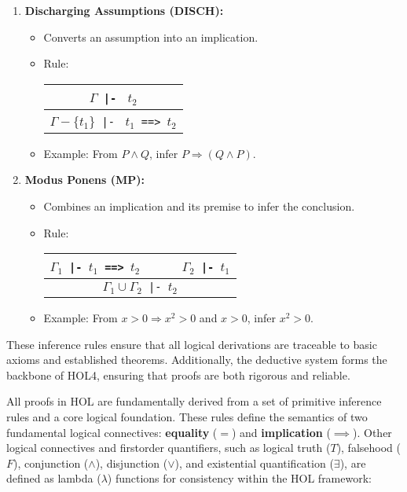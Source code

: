 \begin{enumerate}
    \item \textbf{Discharging Assumptions (DISCH):}
    \begin{itemize}
        \item Converts an assumption into an implication.
        \item Rule:
          \begin{center}
            \begin{tabular}{c}
              $\Gamma${\small\verb+ |- +} $t_2$ \\ \hline
              $\Gamma{-}\{t_1\}${\small\verb+ |- +} $t_1${\small\verb+ ==> +}$t_2$
            \end{tabular}
          \end{center}
        \item Example: From \(P \wedge Q\), infer \(P \Rightarrow (Q \wedge P)\).
    \end{itemize}

    \item \textbf{Modus Ponens (MP):}
    \begin{itemize}
        \item Combines an implication and its premise to infer the conclusion.
        \item Rule:
          \begin{center}
            \begin{tabular}{c}
              $\Gamma_1${\small\verb+ |- +}$t_1${\small\verb+ ==> +}$t_2$ {\small\verb+     +} $\Gamma_2${\small\verb+ |- +}$t_1$ \\
              \hline
              $\Gamma_1 \cup \Gamma_2${\small\verb+ |- +}$t_2$ \\
            \end{tabular}
          \end{center}
        \item Example: From \(x > 0 \Rightarrow x^2 > 0\) and \(x > 0\), infer \(x^2 > 0\).
    \end{itemize}
\end{enumerate}
These inference rules ensure that all logical derivations are traceable to basic axioms and established theorems. Additionally, the deductive system forms the backbone of HOL4, ensuring that proofs are both rigorous and reliable.

All proofs in HOL are fundamentally derived from a set of primitive inference rules and a core logical foundation. These rules define the semantics of two fundamental logical connectives: \textbf{equality} (\(=\)) and \textbf{implication} (\(\implies\)). Other logical connectives and first\-order quantifiers, such as logical truth (\(T\)), falsehood (\(F\)), conjunction (\(\wedge\)), disjunction (\(\vee\)), and existential quantification (\(\exists\)), are defined as lambda (\(\lambda\)) functions for consistency within the HOL framework:

